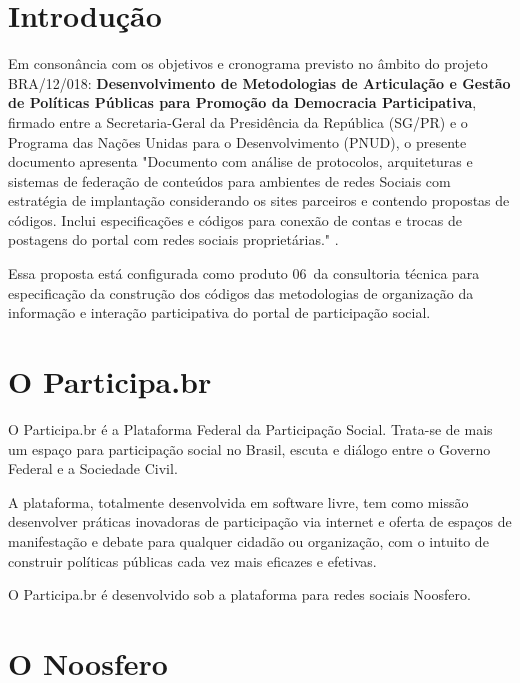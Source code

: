 \documentclass[12pt]{article}
\newcommand{\ProductNumber}{06}
\newcommand{\ProductDescription}{"Documento com análise de protocolos,
  arquiteturas e sistemas de federação de conteúdos para ambientes de redes
  Sociais com estratégia de implantação considerando os sites parceiros e
  contendo propostas de códigos. Inclui especificações e códigos para conexão
  de contas e trocas de postagens do portal com redes sociais proprietárias."
}
\newcommand{\PalavrasChave}{federação, redes sociais, diaspora, descentralização}
\begin{document}




\tableofcontents
\newpage

\begin{abstract}
Documento com análise de protocolos e ferramentas de federação para redes
sociais, proposta de implementação do protocolo Diaspora ao Noosfero,
integração entre Participa.br e redes Diaspora. \\

{\bf Palavras-chave:} \PalavrasChave.
\end{abstract}
\newpage

\section{Introdução}

Em consonância com os objetivos e cronograma previsto no âmbito do
projeto BRA/12/018:
\textbf{Desenvolvimento de Metodologias de Articulação e Gestão de
Políticas Públicas para Promoção da Democracia Participativa},
firmado entre a Secretaria-Geral da Presidência da República
(SG/PR) e o Programa das Nações Unidas para o Desenvolvimento (PNUD),
o presente documento apresenta \ProductDescription.

Essa proposta está configurada como produto \ProductNumber~da consultoria técnica
para especificação da construção dos códigos das metodologias de
organização da informação e interação participativa do portal de
participação social.

\section{O Participa.br}

O Participa.br é a Plataforma Federal da Participação Social. Trata-se de mais
um espaço para participação social no Brasil, escuta e diálogo entre o Governo
Federal e a Sociedade Civil. 

A plataforma, totalmente desenvolvida em software livre, tem como missão
desenvolver práticas inovadoras de participação via internet e oferta de
espaços de manifestação e debate para qualquer cidadão ou organização, com o
intuito de construir políticas públicas cada vez mais eficazes e efetivas.

O Participa.br é desenvolvido sob a plataforma para redes sociais Noosfero.

\section{O Noosfero}
\end{document}
